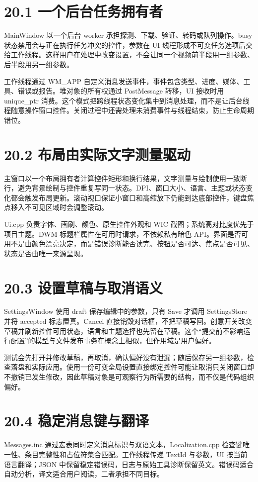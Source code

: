 \documentclass[UTF8,zihao=-4,openany]{ctexbook}
\begin{document}
\section*{20.1 一个后台任务拥有者}
MainWindow 以一个后台 worker 承担探测、下载、验证、转码或队列操作。busy 状态禁用会与正在执行任务冲突的控件，参数在 UI 线程形成不可变任务选项后交给工作线程。这样用户在处理中改变设置，不会让同一个视频前半段用一组参数、后半段用另一组参数。

工作线程通过 WM\_APP 自定义消息发送事件，事件包含类型、进度、媒体、工具、错误或报告。堆对象的所有权通过 PostMessage 转移，UI 接收时用 unique\_ptr 消费。这个模式把跨线程状态变化集中到消息处理，而不是让后台线程随意操作窗口控件。关闭过程中还需处理未消费事件与线程结束，防止生命周期错位。


\section*{20.2 布局由实际文字测量驱动}
主窗口以一个布局拥有者计算控件矩形和换行结果，文字测量与绘制使用一致断行，避免背景绘制与控件重复写同一状态。DPI、窗口大小、语言、主题或状态变化都会触发布局更新。滚动视口保证小窗口和高缩放下仍能到达底部控件，键盘焦点移入不可见区域时会调整滚动。

Ui.cpp 负责字体、画刷、颜色、原生控件外观和 WIC 截图；系统高对比度优先于项目主题。DWM 标题栏属性在可用时请求，不依赖私有暗色 API。界面是否可用不是由颜色漂亮决定，而是错误诊断能否读完、按钮是否可达、焦点是否可见、状态是否由唯一来源呈现。


\section*{20.3 设置草稿与取消语义}
SettingsWindow 使用 draft 保存编辑中的参数，只有 Save 才调用 SettingsStore 并将 accepted 标志置真。Cancel 直接销毁对话框，不把草稿写回。创意开关改变草稿并刷新控件可用状态，语言和主题选择也先留在草稿。这个“提交前不影响运行配置”的模型与文件发布事务在概念上相似，但作用域是用户偏好。

测试会先打开并修改草稿，再取消，确认偏好没有泄漏；随后保存另一组参数，检查落盘和实际应用。使用一份可变全局设置直接绑定控件可能让取消只关闭窗口却不撤销已发生修改，因此草稿对象是可观察行为所需要的结构，而不仅是代码组织偏好。


\section*{20.4 稳定消息键与翻译}
Messages.inc 通过宏表同时定义消息标识与双语文本，Localization.cpp 检查键唯一性、条目完整性和占位符集合匹配。工作线程传递 TextId 与参数，UI 按当前语言翻译；JSON 中保留稳定错误码，日志与原始工具诊断保留英文。错误码适合自动分析，译文适合用户阅读，二者承担不同目标。
\end{document}

